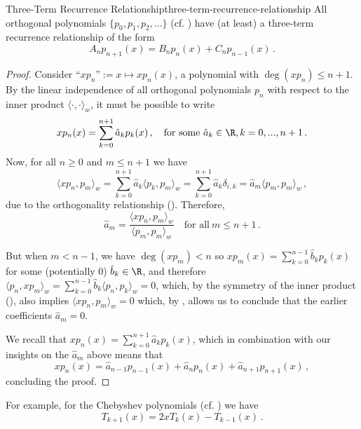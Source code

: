 \begin{theorem}{Three-Term Recurrence Relationship}{three-term-recurrence-relationship}
  All orthogonal polynomials $\{p_0, p_1, p_2, ...\}$ (cf. ) have (at least) a three-term recurrence relationship of the form
  $$A_n p_{n+1}(x) = B_n p_n(x) + C_n p_{n-1}(x)\,.$$
\end{theorem}
\begin{proof}
  Consider ``$x p_n$''$:= x \mapsto x p_n(x)$, a polynomial with $\deg(x p_n) \le n+1$.
  By the linear independence of all orthogonal polynomials $p_n$ with respect to the inner product $\langle \cdot, \cdot \rangle_w$, it must be possible to write
  $$x p_n(x) = \sum_{k=0}^{n+1} \hat{a}_k p_k(x)\,,\quad \text{for some}~\hat{a}_k \in \R, k=0, ..., n+1\,.$$
  Now, for all $n \ge 0$ and $m \le n+1$ we have
  $$\langle xp_n, p_m \rangle_w = \sum_{k=0}^{n+1} \hat{a}_k \langle p_k, p_m \rangle_w = \sum_{k=0}^{n+1} \hat{a}_k \delta_{i,k} = \hat{a}_m \langle p_m, p_m \rangle_w\,,$$
  due to the orthogonality relationship ().
  Therefore,
  \begin{equation}
    \hat{a}_m = \frac{\langle xp_n, p_m \rangle_w}{\langle p_m, p_m \rangle_w} \quad\text{for all}~m \le n+1\,.
    \label{eq:three-term-step}
  \end{equation}

  But when \underline{$m < n-1$}, we have $\deg(xp_m) < n$ so $x p_m(x) = \sum_{k=0}^{n-1} \hat{b}_k p_k(x)$ for some (potentially 0) $\hat{b}_k \in \R$, and therefore $\langle p_n, xp_m \rangle_w = \sum_{k=0}^{n-1} \hat{b}_k \langle p_n, p_k \rangle_w = 0$,
  which, by the symmetry of the inner product (), also implies $\langle x p_n, p_m \rangle_w = 0$ which, by , allows us to conclude that the earlier coefficients $\hat{a}_m = 0$.


  We recall that $xp_n(x) = \sum_{k=0}^{n+1} \hat{a}_k p_k(x)$, which in combination with our insights on the $\hat{a}_m$ above means that
  $$xp_n(x) = \hat{a}_{n-1} p_{n-1}(x) + \hat{a}_{n} p_n(x) + \hat{a}_{n+1} p_{n+1}(x)\,,$$
  concluding the proof.
\end{proof}

For example, for the Chebyshev polynomials (cf. ) we have
$$T_{k+1}(x) = 2x T_k(x) - T_{k-1}(x) \,.$$

